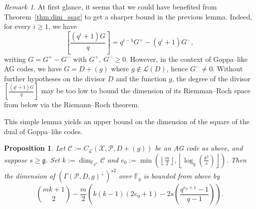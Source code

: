 \documentclass[peerreview]{IEEEtran}
\theoremstyle{plain}
\newtheorem{proposition}[thm]{Proposition}
\theoremstyle{definition}
\theoremstyle{remark}
\newtheorem{remark}[thm]{Remark}
\newcommand{\calP}{\mathcal{P}}
\newcommand{\calL}{\mathcal{L}}
\newcommand{\calC}{\mathcal{C}}
\newcommand{\calX}{\mathcal{X}}
\newcommand{\fqm}{\mathbb{F}_{q^m}}
\newcommand{\fq}{\mathbb{F}_{q}}
\begin{document}
	\begin{remark}\label{rmk:improvements}
		At first glance, it seems that we could have benefited from Theorem~\ref{thm:dim_ssag} to get a sharper bound in the previous lemma. Indeed, for every $i \geq 1$, we have 
		\[\left[\frac{(q^i+1)G}{q}\right]=q^{i-1}G^+ - (q^i+1)G^-,\]
		writing $G=G^+-G^-$ with $G^+, \: G^- \geq 0$. However, in the context of Goppa--like AG codes, we have $G=D+(g)$ where $g \notin \calL(D)$, hence $G^- \neq 0$. Without further hypotheses on the divisor $D$ and the function $g$, the degree of the divisor $\left[\frac{(q^i+1)G}{q}\right]$ may be too low to bound the dimension of its Riemman--Roch space from below via the Riemann--Roch theorem.
	\end{remark}
	
	This simple lemma yields an upper bound on the dimension of the square of the dual of Goppa--like codes.
	\begin{proposition} \label{prop:bound_dim_using_inclusions}
		Let $\calC := C_{\calL}(\calX,\calP,D+(g))$ be an AG code as above, and suppose $s \geq \mathfrak{g}$. Set $k := \dim_{\fqm}\calC$ and  $e_0 := \min\left(\left\lfloor \frac{m}{2} \right\rfloor,\left\lfloor \log_q\left(\frac{k^2}{s}\right)\right\rfloor\right)$. Then the dimension of $(\Gamma(\calP,D,g)^{\perp})^{\star 2}$ over $\fq$ is bounded from above by
\[
 \binom{mk+1}{2} - \dfrac{m}{2}\left(k(k-1)(2e_0+1)-2s\left(\dfrac{q^{e_0+1}-1}{q-1}\right)\right).
\]		
	\end{proposition}
	
\end{document}
